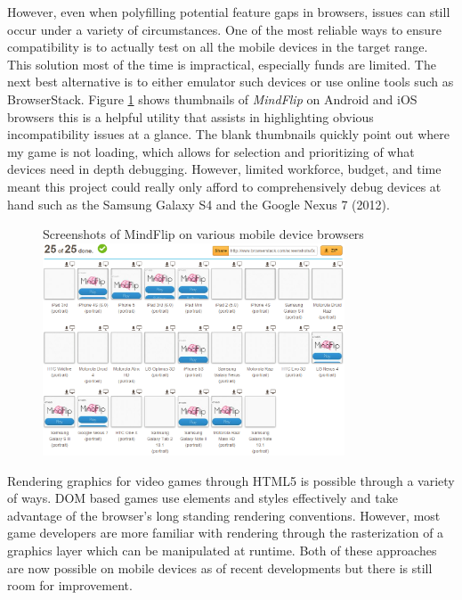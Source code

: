 \documentclass[final]{cmpreport}
\begin{document}
However, even when polyfilling potential feature gaps in browsers, issues can still occur under a variety of circumstances. One of the most reliable ways to ensure compatibility is to actually test on all the mobile devices in the target range. This solution most of the time is impractical, especially funds are limited. The next best alternative is to either emulator such devices or use online tools such as BrowserStack\footnotemark. Figure \ref{browserstack} shows thumbnails of \textit{MindFlip} on Android and iOS browsers this is a helpful utility that assists in highlighting obvious incompatibility issues at a glance. The blank thumbnails quickly point out where my game is not loading, which allows for selection and prioritizing of what devices need in depth debugging. However, limited workforce, budget, and time meant this project could really only afford to comprehensively debug devices at hand such as the Samsung Galaxy S4 and the Google Nexus 7 (2012).


\begin{figure}[h]{Screenshots of MindFlip on various mobile device browsers \label{browserstack}}
  \centering
    \includegraphics[width=0.8\textwidth]{browserstack.png}
\end{figure}

\clearpage
Rendering graphics for video games through HTML5 is possible through a variety of ways. DOM based games use elements and styles effectively and take advantage of the browser's long standing rendering conventions. However, most game developers are more familiar with rendering through the rasterization of a graphics layer which can be manipulated at runtime. Both of these approaches are now possible on mobile devices as of recent developments but there is still room for improvement.
\end{document}
